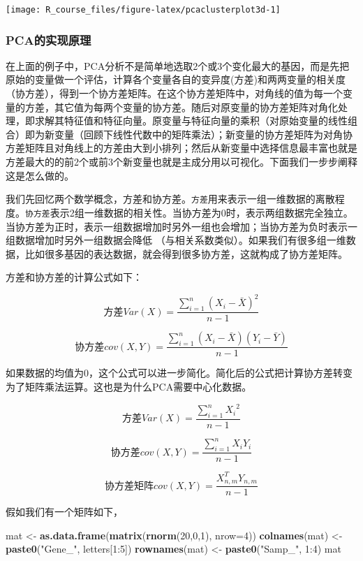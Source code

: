 \documentclass[]{article}
\newenvironment{Shaded}{\begin{snugshade}}{\end{snugshade}}
\newcommand{\KeywordTok}[1]{\textcolor[rgb]{0.13,0.29,0.53}{\textbf{{#1}}}}
\newcommand{\DataTypeTok}[1]{\textcolor[rgb]{0.13,0.29,0.53}{{#1}}}
\newcommand{\DecValTok}[1]{\textcolor[rgb]{0.00,0.00,0.81}{{#1}}}
\newcommand{\StringTok}[1]{\textcolor[rgb]{0.31,0.60,0.02}{{#1}}}
\newcommand{\NormalTok}[1]{{#1}}
\numberwithin{figure}{section}
\numberwithin{table}{section}
\theoremstyle{definition}
\theoremstyle{definition}
\theoremstyle{definition}
\theoremstyle{remark}
\begin{document}
\begin{center}\texttt{[image: R\_course\_files/figure-latex/pcaclusterplot3d-1]} \end{center}

\subsubsection{PCA的实现原理}\label{pca}

在上面的例子中，PCA分析不是简单地选取2个或3个变化最大的基因，而是先把原始的变量做一个评估，计算各个变量各自的变异度(方差)和两两变量的相关度（协方差），得到一个协方差矩阵。在这个协方差矩阵中，对角线的值为每一个变量的方差，其它值为每两个变量的协方差。随后对原变量的协方差矩阵对角化处理，即求解其特征值和特征向量。原变量与特征向量的乘积（对原始变量的线性组合）即为新变量（回顾下线性代数中的矩阵乘法）；新变量的协方差矩阵为对角协方差矩阵且对角线上的方差由大到小排列；然后从新变量中选择信息最丰富也就是方差最大的的前2个或前3个新变量也就是主成分用以可视化。下面我们一步步阐释这是怎么做的。

我们先回忆两个数学概念，方差和协方差。\texttt{方差}用来表示一组一维数据的离散程度。\texttt{协方差}表示2组一维数据的相关性。当协方差为0时，表示两组数据完全独立。当协方差为正时，表示一组数据增加时另外一组也会增加；当协方差为负时表示一组数据增加时另外一组数据会降低
（与相关系数类似）。如果我们有很多组一维数据，比如很多基因的表达数据，就会得到很多协方差，这就构成了协方差矩阵。

方差和协方差的计算公式如下：

\[
方差 Var(X) = \frac{\sum_{i=1}^{n}(X_i-\bar X)^2}{n-1}
\]

\[
协方差 cov(X,Y) = \frac{\sum_{i=1}^{n}(X_i-\bar X)(Y_i-\bar Y)}{n-1}
\]

如果数据的均值为0，这个公式可以进一步简化。简化后的公式把计算协方差转变为了矩阵乘法运算。这也是为什么PCA需要中心化数据。

\[
方差 Var(X) = \frac{\sum_{i=1}^{n}{X_i}^2}{n-1}
\]

\[
协方差 cov(X,Y) = \frac{\sum_{i=1}^{n}X_iY_i}{n-1}
\]

\[
协方差矩阵 cov(X,Y) = \frac{X_{n,m}^T Y_{n,m}}{n-1}
\]

假如我们有一个矩阵如下，

\begin{Shaded}
\begin{Highlighting}[]
\NormalTok{mat <-}\StringTok{ }\KeywordTok{as.data.frame}\NormalTok{(}\KeywordTok{matrix}\NormalTok{(}\KeywordTok{rnorm}\NormalTok{(}\DecValTok{20}\NormalTok{,}\DecValTok{0}\NormalTok{,}\DecValTok{1}\NormalTok{), }\DataTypeTok{nrow=}\DecValTok{4}\NormalTok{))}
\KeywordTok{colnames}\NormalTok{(mat) <-}\StringTok{ }\KeywordTok{paste0}\NormalTok{(}\StringTok{"Gene_"}\NormalTok{, letters[}\DecValTok{1}\NormalTok{:}\DecValTok{5}\NormalTok{])}
\KeywordTok{rownames}\NormalTok{(mat) <-}\StringTok{ }\KeywordTok{paste0}\NormalTok{(}\StringTok{"Samp_"}\NormalTok{, }\DecValTok{1}\NormalTok{:}\DecValTok{4}\NormalTok{)}
\NormalTok{mat}
\end{Highlighting}
\end{Shaded}
\end{document}
